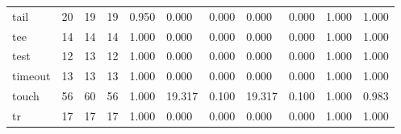 \begin{longtable}{lp{1.8cm}p{1.8cm}p{1.8cm}p{1.8cm}p{1.8cm}p{1.8cm}p{1.8cm}p{1.8cm}p{1.8cm}p{1.8cm}}
tail      &                           20 &                 19 &                                19 &                                      0.950 &                                  0.000 &                                        0.000 &                             0.000 &                                   0.000 &                              1.000 &                                              1.000 \\
tee       &                           14 &                 14 &                                14 &                                      1.000 &                                  0.000 &                                        0.000 &                             0.000 &                                   0.000 &                              1.000 &                                              1.000 \\
test      &                           12 &                 13 &                                12 &                                      1.000 &                                  0.000 &                                        0.000 &                             0.000 &                                   0.000 &                              1.000 &                                              1.000 \\
timeout   &                           13 &                 13 &                                13 &                                      1.000 &                                  0.000 &                                        0.000 &                             0.000 &                                   0.000 &                              1.000 &                                              1.000 \\
touch     &                           56 &                 60 &                                56 &                                      1.000 &                                 19.317 &                                        0.100 &                            19.317 &                                   0.100 &                              1.000 &                                              0.983 \\
tr        &                           17 &                 17 &                                17 &                                      1.000 &                                  0.000 &                                        0.000 &                             0.000 &                                   0.000 &                              1.000 &                                              1.000 \\

\end{longtable}
